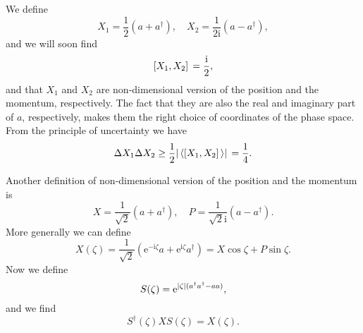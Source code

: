 \documentclass[hyperref, a4paper]{article}
\newcommand*{\ii}{\mathrm{i}}
\newcommand*{\ee}{\mathrm{e}}
\begin{document}
We define 
\begin{equation}
    X_1 = \frac{1}{2} (a + a^\dagger), \quad X_2 = \frac{1}{2 \ii} (a - a^\dagger),
\end{equation}
and we will soon find 
\begin{equation}
    \comm*{X_1}{X_2} = \frac{\ii}{2},
\end{equation}
and that $X_1$ and $X_2$ are non-dimensional version of the position and the momentum, respectively.
The fact that they are also the real and imaginary part of $a$, respectively, makes them the right choice 
of coordinates of the phase space. From the principle of uncertainty we have 
\begin{equation}
    \Delta X_1 \Delta X_2 \geq \frac{1}{2} \abs*{\expval*{\comm*{X_1}{X_2}}} = \frac{1}{4}.
\end{equation}

Another definition of non-dimensional version of the position and the momentum is 
\begin{equation}
    X = \frac{1}{\sqrt{2}} (a + a^\dagger), \quad P = \frac{1}{\sqrt{2} \ii} (a - a^\dagger).
\end{equation}
More generally we can define 
\begin{equation}
    X(\zeta) = \frac{1}{\sqrt{2}} (\ee^{- \ii \zeta} a + \ee^{\ii \zeta} a^\dagger) = X \cos \zeta + P \sin \zeta.
\end{equation}
Now we define 
\begin{equation}
    S(\zeta) = \ee^{\abs*{\zeta} (a^\dagger a^\dagger - a a)},
\end{equation}
and we find 
\begin{equation}
    S^\dagger(\zeta) X S(\zeta) = X(\zeta).
\end{equation}
\end{document}

